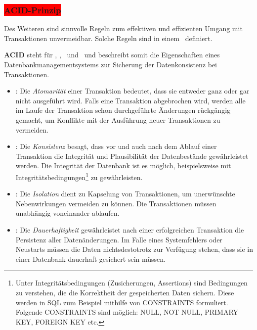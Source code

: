 \subsubsection{\colorbox{red}{ACID-Prinzip}}\label{acid}

Des Weiteren sind sinnvolle Regeln zum effektiven und effizienten Umgang mit Transaktionen unvermeidbar. Solche Regeln sind in einem \acid\ definiert.

\textbf{ACID} steht für \Acid, \aCid, \acId\ und \aciD\ und beschreibt somit die Eigenschaften eines Datenbankmanagementsystems zur Sicherung der Datenkonsistenz bei Transaktionen.
\begin{itemize}

\item \Acid: Die \textit{Atomarität} einer Transaktion bedeutet, dass sie entweder ganz oder gar nicht ausgeführt wird. Falls eine Transaktion abgebrochen wird, werden alle im Laufe der Transaktion schon durchgeführte Änderungen rückgängig gemacht, um Konflikte mit der Ausführung neuer Transaktionen zu vermeiden.%
\item \aCid: Die \textit{Konsistenz} besagt, dass vor und auch nach dem Ablauf einer Transaktion die Integrität und Plausibilität der Datenbestände gewährleistet werden. Die Integrität der Datenbank ist es möglich, beispielsweise mit Integritätsbedingungen\footnote{Unter Integritätsbedingungen (Zusicherungen, Assertions) sind Bedingungen zu verstehen, die die Korrektheit der gespeicherten Daten sichern. Diese werden in SQL zum Beispiel mithilfe von CONSTRAINTS formuliert. Folgende CONSTRAINTS sind möglich: NULL, NOT NULL, PRIMARY KEY, FOREIGN KEY etc.} zu gewährleisten. 
\item \acId: Die \textit{Isolation} dient zu Kapselung von Transaktionen, um unerwünschte Nebenwirkungen vermeiden zu können. Die Transaktionen müssen unabhängig voneinander ablaufen.
\item \aciD: Die \textit{Dauerhaftigkeit} gewährleistet nach einer erfolgreichen Transaktion die Persistenz aller Datenänderungen. Im Falle eines Systemfehlers oder Neustarts müssen die Daten nichtsdestotrotz zur Verfügung stehen, dass sie in einer Datenbank dauerhaft gesichert sein müssen.
\end{itemize}


